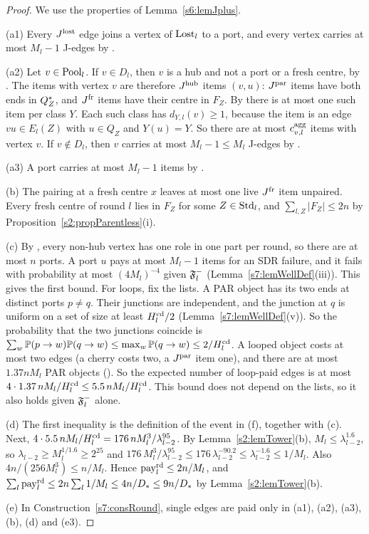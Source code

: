 \begin{proof}
We use the properties of Lemma~\ref{s6:lemJplus}.

(a1) Every $J^{\mathrm{lost}}$ edge joins a vertex of $\mathrm{Lost}_l$ to a port, and every vertex
carries at most $M_l-1$ J-edges by .

(a2) Let $v\in\mathrm{Pool}_l$. If $v\in D_l$, then $v$ is a hub and not a port or a
fresh centre, by . The items with vertex $v$ are therefore $J^{\mathrm{hub}}$ items
$(v,u)$: $J^{\mathrm{par}}$ items have both ends in $Q^{*}_Z$, and $J^{\mathrm{fr}}$ items have their
centre in $F_Z$. By  there is at most one such item per class $Y$. Each
such class has $d_{Y,l}(v)\ge1$, because the item is an edge $vu\in E_l(Z)$ with
$u\in Q_Z$ and $Y(u)=Y$. So there are at most $c^{\mathrm{agg}}_{v,l}$ items with vertex
$v$. If $v\notin D_l$, then $v$ carries at most $M_l-1\le M_l$ J-edges by .

(a3) A port carries at most $M_l-1$ items by .

(b) The pairing at a fresh centre $x$ leaves at most one live $J^{\mathrm{fr}}$ item
unpaired. Every fresh centre of round $l$ lies in $F_Z$ for some $Z\in\mathrm{Std}_l$,
and $\sum_{l,Z}|F_Z|\le2n$ by Proposition~\ref{s2:propParentless}(i).

(c) By , every non-hub vertex has one role in one part per round, so there
are at most $n$ ports. A port $u$ pays at most $M_l-1$ items for an SDR failure,
and it fails with probability at most $(4M_l)^{-4}$ given $\mathfrak{F}^{-}_l$
(Lemma~\ref{s7:lemWellDef}(iii)). This gives the first bound. For loops, fix the
lists. A PAR object has its two ends at distinct ports $p\ne q$. Their junctions
are independent, and the junction at $q$ is uniform on a set of size at least
$H^{\mathrm{cd}}_l/2$ (Lemma~\ref{s7:lemWellDef}(v)). So the probability that the two
junctions coincide is
$\sum_w\mathbb{P}(p\to w)\mathbb{P}(q\to w)\le\max_w\mathbb{P}(q\to w)\le2/H^{\mathrm{cd}}_l$. A looped
object costs at most two edges (a cherry costs two, a $J^{\mathrm{par}}$ item one), and
there are at most $1.37nM_l$ PAR objects (). So the expected number of
loop-paid edges is at most $4\cdot1.37\,nM_l/H^{\mathrm{cd}}_l\le5.5\,nM_l/H^{\mathrm{cd}}_l$. This
bound does not depend on the lists, so it also holds given $\mathfrak{F}^{-}_l$ alone.

(d) The first inequality is the definition of the event in (f), together with
(c). Next, $4\cdot5.5\,nM_l/H^{\mathrm{cd}}_l=176\,nM_l^3/\lambda_{l-2}^{95}$. By
Lemma~\ref{s2:lemTower}(b), $M_l\le\lambda_{l-2}^{1.6}$, so
$\lambda_{l-2}\ge M_l^{1/1.6}\ge2^{25}$ and
$176\,M_l^3/\lambda_{l-2}^{95}\le176\,\lambda_{l-2}^{-90.2}\le\lambda_{l-2}^{-1.6}\le1/M_l$.
Also $4n/(256M_l^3)\le n/M_l$. Hence $\mathrm{pay}^{\mathrm{rd}}_l\le2n/M_l$, and
$\sum_l\mathrm{pay}^{\mathrm{rd}}_l\le2n\sum_l1/M_l\le4n/D_{*}\le9n/D_{*}$ by
Lemma~\ref{s2:lemTower}(b).

(e) In Construction~\ref{s7:consRound}, single edges are paid only in (a1),
(a2), (a3), (b), (d) and (e3).
\end{proof}

